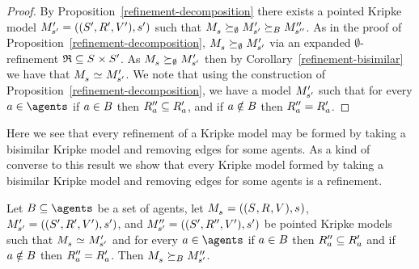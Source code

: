 \begin{proof}
By Proposition~\ref{refinement-decomposition} there exists a pointed Kripke model $\kPModelAndTupleP{\kStateSP}$ such that $\kPModel{\kStateS} \simulates[\emptyset] \kPModelP{\kStateSP} \simulatesBs \kPModelPP{\kStateSPP}$.
As in the proof of Proposition~\ref{refinement-decomposition}, $\kPModel{\kStateS} \simulates[\emptyset] \kPModelP{\kStateSP}$ via an expanded $\emptyset$-refinement $\refinement \subseteq \kStates \times \kStatesP$.
As $\kPModel{\kStateS} \simulates[\emptyset] \kPModelP{\kStateSP}$ then by Corollary~\ref{refinement-bisimilar} we have that $\kPModel{\kStateS} \bisimilar \kPModelP{\kStateSP}$.
We note that using the construction of Proposition~\ref{refinement-decomposition}, we have a model ${M^{\prime}_{{s}^{\prime}}}$ such that for every $\agentA \in \agents$ if $a \in B$ then ${R^{\prime\prime}_{a}} \subseteq {R^{\prime}_{a}}$, and if $a \notin B$ then ${R^{\prime\prime}_{a}} = {R^{\prime}_{a}}$.
\end{proof}

Here we see that every refinement of a Kripke model may be formed by taking a bisimilar Kripke model and removing edges for some agents.
As a kind of converse to this result we show that every Kripke model formed by taking a bisimilar Kripke model and removing edges for some agents is a refinement.

\begin{proposition}\label{subrelations-refinement}
Let $\agentsB \subseteq \agents$ be a set of agents, let $\kPModelAndTuple{\kStateS}$, $\kPModelAndTupleP{\kStateSP}$, and ${M^{\prime\prime}_{{s}^{\prime}}} = (({S^{\prime}}, {R^{\prime\prime}_{}}, {V^{\prime}}), {s}^{\prime})$ be pointed Kripke models such that $\kPModel{\kStateS} \bisimilar \kPModelP{\kStateSP}$ and for every $\agentA \in \agents$ if $a \in B$ then ${R^{\prime\prime}_{a}} \subseteq {R^{\prime}_{a}}$ and if $a \notin B$ then ${R^{\prime\prime}_{a}} = {R^{\prime}_{a}}$.
Then $\kPModel{\kStateS} \simulatesBs \kPModelPP{\kStateSP}$.
\end{proposition}

